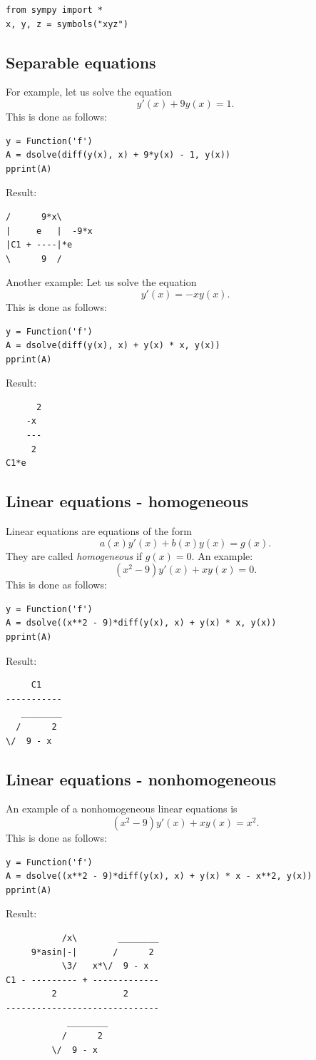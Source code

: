 \documentclass[article,A4,12pt]{llncs}
\begin{document}
\begin{verbatim}
from sympy import *
x, y, z = symbols("xyz")
\end{verbatim}

\subsection{Separable equations}

For example, let us solve the equation 
$$
  y'(x) + 9y(x) = 1.
$$
This is done as follows:
\begin{verbatim}
y = Function('f')
A = dsolve(diff(y(x), x) + 9*y(x) - 1, y(x))
pprint(A)
\end{verbatim}
Result:
\begin{verbatim}
/      9*x\      
|     e   |  -9*x
|C1 + ----|*e    
\      9  /    
\end{verbatim}
Another example: Let us solve the equation 
$$
  y'(x) = -xy(x).
$$
This is done as follows:
\begin{verbatim}
y = Function('f')
A = dsolve(diff(y(x), x) + y(x) * x, y(x))
pprint(A)
\end{verbatim}
Result:
\begin{verbatim}
      2
    -x 
    ---
     2 
C1*e   
\end{verbatim}

\subsection{Linear equations - homogeneous}
Linear equations are equations of the form 
$$
a(x) y'(x) + b(x) y(x) = g(x).
$$ 
They are called {\em homogeneous} if $g(x) = 0$.
An example:
$$
(x^2 - 9) y'(x) + x y(x) = 0.
$$
This is done as follows:
\begin{verbatim}
y = Function('f')
A = dsolve((x**2 - 9)*diff(y(x), x) + y(x) * x, y(x))
pprint(A)
\end{verbatim}
Result:
\begin{verbatim}
     C1    
-----------
   ________
  /      2 
\/  9 - x  
\end{verbatim}

\subsection{Linear equations - nonhomogeneous}

An example of a nonhomogeneous linear equations is
$$
(x^2 - 9) y'(x) + x y(x) = x^2.
$$
This is done as follows:
\begin{verbatim}
y = Function('f')
A = dsolve((x**2 - 9)*diff(y(x), x) + y(x) * x - x**2, y(x))
pprint(A)
\end{verbatim}
Result:
\begin{verbatim}
           /x\        ________
     9*asin|-|       /      2 
           \3/   x*\/  9 - x  
C1 - --------- + -------------
         2             2      
------------------------------
            ________          
           /      2           
         \/  9 - x            
\end{verbatim}
\end{document}
